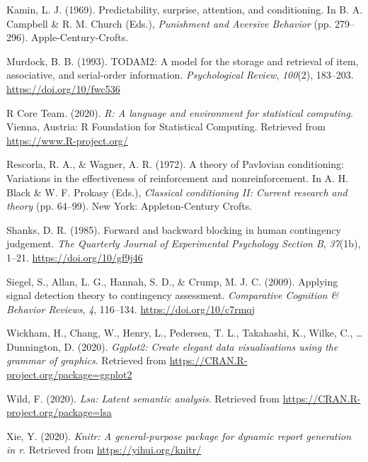 \documentclass[
  english,
  man,floatsintext]{apa6}
\begin{document}
\leavevmode\hypertarget{ref-kaminPredictabilitySurpriseAttention1969}{}%
Kamin, L. J. (1969). Predictability, surprise, attention, and conditioning. In B. A. Campbell \& R. M. Church (Eds.), \emph{Punishment and Aversive Behavior} (pp. 279--296). Apple-Century-Crofts.

\leavevmode\hypertarget{ref-murdockTODAM2ModelStorage1993}{}%
Murdock, B. B. (1993). TODAM2: A model for the storage and retrieval of item, associative, and serial-order information. \emph{Psychological Review}, \emph{100}(2), 183--203. \url{https://doi.org/10/fwc536}

\leavevmode\hypertarget{ref-R-base}{}%
R Core Team. (2020). \emph{R: A language and environment for statistical computing}. Vienna, Austria: R Foundation for Statistical Computing. Retrieved from \url{https://www.R-project.org/}

\leavevmode\hypertarget{ref-rescorlaTheoryPavlovianConditioning1972}{}%
Rescorla, R. A., \& Wagner, A. R. (1972). A theory of Pavlovian conditioning: Variations in the effectiveness of reinforcement and nonreinforcement. In A. H. Black \& W. F. Prokasy (Eds.), \emph{Classical conditioning II: Current research and theory} (pp. 64--99). New York: Appleton-Century Crofts.

\leavevmode\hypertarget{ref-shanksForwardBackwardBlocking1985}{}%
Shanks, D. R. (1985). Forward and backward blocking in human contingency judgement. \emph{The Quarterly Journal of Experimental Psychology Section B}, \emph{37}(1b), 1--21. \url{https://doi.org/10/gf9j46}

\leavevmode\hypertarget{ref-siegelApplyingSignalDetection2009}{}%
Siegel, S., Allan, L. G., Hannah, S. D., \& Crump, M. J. C. (2009). Applying signal detection theory to contingency assessment. \emph{Comparative Cognition \& Behavior Reviews}, \emph{4}, 116--134. \url{https://doi.org/10/c7rmqj}

\leavevmode\hypertarget{ref-R-ggplot2}{}%
Wickham, H., Chang, W., Henry, L., Pedersen, T. L., Takahashi, K., Wilke, C., \ldots{} Dunnington, D. (2020). \emph{Ggplot2: Create elegant data visualisations using the grammar of graphics}. Retrieved from \url{https://CRAN.R-project.org/package=ggplot2}

\leavevmode\hypertarget{ref-R-lsa}{}%
Wild, F. (2020). \emph{Lsa: Latent semantic analysis}. Retrieved from \url{https://CRAN.R-project.org/package=lsa}

\leavevmode\hypertarget{ref-R-knitr}{}%
Xie, Y. (2020). \emph{Knitr: A general-purpose package for dynamic report generation in r}. Retrieved from \url{https://yihui.org/knitr/}
\end{document}
